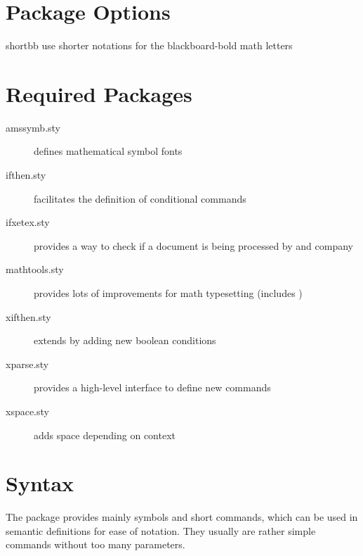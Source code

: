 \documentclass[english,a4paper,DIV=12,parskip=full,oneside]{scrartcl}
\begin{document}
    \section{Package Options}
        \label{sec:package-options}
        \begin{commandlist}
            \item[shortbb] use shorter notations for the blackboard-bold math letters \codeCommand{\C, \K, \N, \Q, \R, \Z}
        \end{commandlist}

    \section{Required Packages}
        \label{sec:required-packages}
        \begin{description}
            \item[amssymb.sty] defines mathematical symbol fonts
            \item[ifthen.sty] facilitates the definition of conditional commands
            \item[ifxetex.sty] provides a way to check if a document is being processed by \XeTeX{} and company
            \item[mathtools.sty] provides lots of improvements for math typesetting (includes )
            \item[xifthen.sty] extends  by adding new boolean conditions
            \item[xparse.sty] provides a high-level interface to define new commands
            \item[xspace.sty] adds space depending on context
        \end{description}


    \section{Syntax}
        \label{sec:syntax}

    The  package provides mainly symbols and short commands, which can be used in semantic definitions for ease of notation.
    They usually are rather simple commands without too many parameters.
\end{document}
